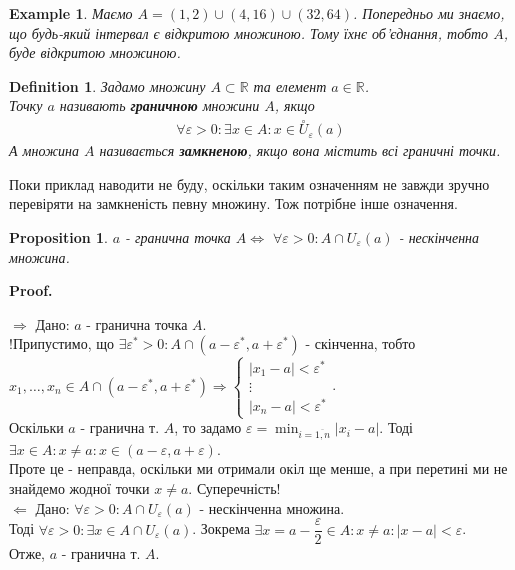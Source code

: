 \documentclass[a4paper, 14pt]{article}
\makeatletter
\def\qed{$\blacksquare$}
\def\rightproof{$\boxed{\Rightarrow}$ }
\def\leftproof{$\boxed{\Leftarrow}$ }
\theoremstyle{theoremdd}
\theoremstyle{theoremdd}
\newtheorem{definition}[theorem]{Definition}
\theoremstyle{theoremdd}
\theoremstyle{theoremdd}
\newtheorem{example}[theorem]{Example}
\theoremstyle{theoremdd}
\newtheorem{proposition}[theorem]{Proposition}
\theoremstyle{theoremdd}
\theoremstyle{theoremdd}
\theoremstyle{theoremdd}
\renewenvironment{proof}[1][Proof.\\]{\par
\pushQED{\hfill \qed}%
\normalfont \topsep6\p@\@plus6\p@\relax
\trivlist
\item\relax
{\bfseries
#1\@addpunct{.}}\hspace\labelsep\ignorespaces
}{%
\popQED\endtrivlist\@endpefalse
}
\makeatother
\begin{document}
\begin{example}
Маємо $A = (1,2) \cup (4,16) \cup (32, 64)$. Попередньо ми знаємо, що будь-який інтервал є відкритою множиною. Тому їхнє об'єднання, тобто $A$, буде відкритою множиною.
\end{example}

\begin{definition}
Задамо множину $A \subset \mathbb{R}$ та елемент $a \in \mathbb{R}$.\\
Точку $a$ називають \textbf{граничною} множини $A$, якщо
\begin{align*}
\forall \varepsilon > 0: \exists x \in A: x \in \overset{\circ}{U}_{\varepsilon}(a)
\end{align*}
А множина $A$ називається \textbf{замкненою}, якщо вона містить всі граничні точки.
\end{definition}
Поки приклад наводити не буду, оскільки таким означенням не завжди зручно перевіряти на замкненість певну множину. Тож потрібне інше означення.
\begin{proposition}
$a$ - гранична точка $A \iff$ $\forall \varepsilon > 0: A \cap U_{\varepsilon}(a)$ - нескінченна множина.
\end{proposition}

\begin{proof}
\rightproof Дано: $a$ - гранична точка $A$.\\
!Припустимо, що $\exists \varepsilon^* > 0: A \cap (a-\varepsilon^*,a+\varepsilon^*)$ - скінченна, тобто\\
$x_1,\dots,x_n \in A \cap (a-\varepsilon^*,a+\varepsilon^*) \Rightarrow \begin{cases} |x_1-a| < \varepsilon^* \\ \vdots \\ |x_n-a| < \varepsilon^* \end{cases}$.\\
Оскільки $a$ - гранична т. $A$, то задамо $\varepsilon = \displaystyle\min_{i = \overline{1,n}} |x_i-a|$. Тоді $\exists x \in A: x \neq a: x \in (a-\varepsilon,a+\varepsilon)$.\\
Проте це - неправда, оскільки ми отримали окіл ще менше, а при перетині ми не знайдемо жодної точки $x \neq a$. Суперечність!
\bigskip \\

\leftproof Дано: $\forall \varepsilon > 0: A \cap U_{\varepsilon}(a)$ - нескінченна множина.\\
Тоді $\forall \varepsilon > 0: \exists x \in A \cap U_{\varepsilon}(a)$. Зокрема $\exists x = a - \dfrac{\varepsilon}{2} \in A: x \neq a: |x-a| < \varepsilon$.\\
Отже, $a$ - гранична т. $A$.
\end{proof}
\end{document}
